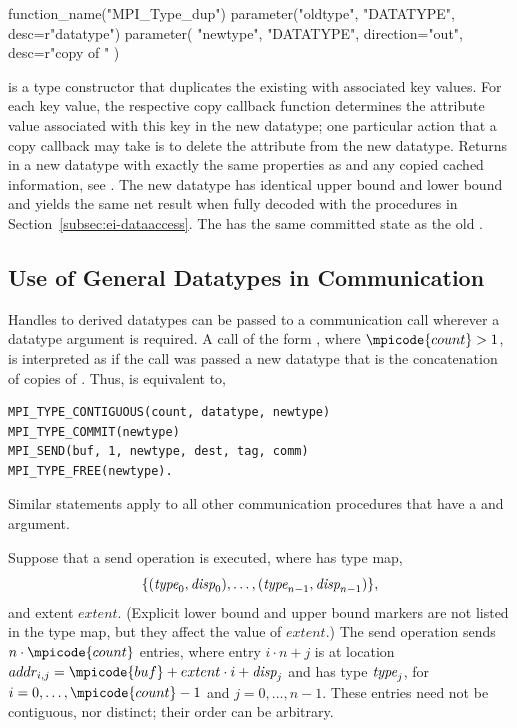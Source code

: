 \begin{mpi-binding}
    function_name("MPI_Type_dup")
    parameter("oldtype", "DATATYPE", desc=r"datatype")
    parameter(
        "newtype", "DATATYPE", direction="out", desc=r"copy of "
    )
\end{mpi-binding}

 is
a type constructor
that duplicates the existing 
with associated key values.
For each key value, the respective copy
callback function determines the attribute value associated with this
key in the new datatype; one particular action that a copy
callback may take is to delete the attribute from the new datatype.
Returns in  a new datatype with exactly the same
properties as  and any copied cached
information, see .
The new datatype has identical
upper bound and lower bound and yields the same net result when fully
decoded with the procedures in Section~\ref{subsec:ei-dataaccess}.
The
 has the same committed state as the old
.

\subsection{Use of General Datatypes in Communication}
\label{subsec:pt2pt-datatypeuse}

Handles to derived datatypes can be passed to a communication call wherever a
datatype argument is required.
A call of the form , where
$\mpicode{count} > 1$, is interpreted as if the call was passed a new datatype
that is the
concatenation of  copies of .
Thus,
 is equivalent to,
\begin{lstlisting}[language={[MPI]Fortran}]
MPI_TYPE_CONTIGUOUS(count, datatype, newtype)
MPI_TYPE_COMMIT(newtype)
MPI_SEND(buf, 1, newtype, dest, tag, comm)
MPI_TYPE_FREE(newtype).
\end{lstlisting}
Similar statements apply to all other communication procedures that have a
 and  argument.

Suppose that a send operation  is executed, where
 has type map,
\[
\{(\textrm{\itshape{type}}_0, \textrm{\itshape{disp}}_0),\ldots,(\textrm{\itshape{type}}_{n-1}, \textrm{\itshape{disp}}_{n-1})\},
\]
and extent $extent$.  (Explicit lower bound and upper bound markers are not listed in the type map, but
they affect the value of $extent$.)
The send
operation sends $n \cdot \mpicode{count}$ entries, where entry $i
\cdot n + j$ is at location
$addr_{i,j} = \mpicode{buf} + extent \cdot i + \mword{disp}_j$
and has type $\textrm{\itshape{type}}_j$,
for $i = 0 ,\ldots, \mpicode{count}-1$ and $j = 0 ,\ldots, n-1$.
These entries need not be contiguous, nor distinct; their order can be
arbitrary.

